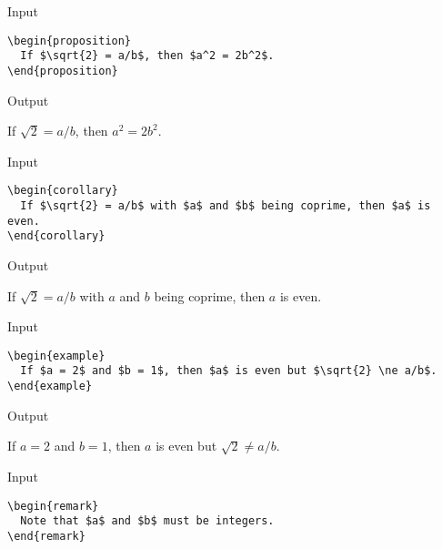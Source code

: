 \documentclass[a4paper, 11pt]{article}
\begin{document}
\begin{itembox}[l]{Input}
  \begin{verbatim}
\begin{proposition}
  If $\sqrt{2} = a/b$, then $a^2 = 2b^2$.
\end{proposition}
\end{verbatim}
\end{itembox}

\begin{itembox}[l]{Output}
  \begin{proposition}
    If $\sqrt{2} = a/b$, then $a^2 = 2b^2$.
  \end{proposition}
\end{itembox}

\begin{itembox}[l]{Input}
  \begin{verbatim}
\begin{corollary}
  If $\sqrt{2} = a/b$ with $a$ and $b$ being coprime, then $a$ is even.
\end{corollary}
\end{verbatim}
\end{itembox}

\begin{itembox}[l]{Output}
  \begin{corollary}
    If $\sqrt{2} = a/b$ with $a$ and $b$ being coprime, then $a$ is even.
  \end{corollary}
\end{itembox}

\begin{itembox}[l]{Input}
  \begin{verbatim}
\begin{example}
  If $a = 2$ and $b = 1$, then $a$ is even but $\sqrt{2} \ne a/b$.
\end{example}
\end{verbatim}
\end{itembox}

\begin{itembox}[l]{Output}
  \begin{example}
    If $a = 2$ and $b = 1$, then $a$ is even but $\sqrt{2} \ne a/b$.
  \end{example}
\end{itembox}

\begin{itembox}[l]{Input}
  \begin{verbatim}
\begin{remark}
  Note that $a$ and $b$ must be integers.
\end{remark}
\end{verbatim}
\end{itembox}
\end{document}
